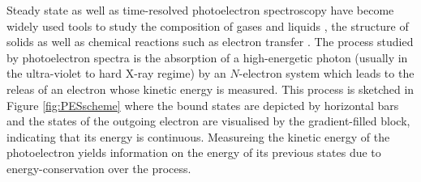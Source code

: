 Steady state as well as time-resolved photoelectron spec\-tros\-co\-py have become widely used tools to study the composition of gases and liquids \cite{winterWater,liquid1,XrayDynamics,hafied}, the structure of solids \cite{solid1} as well as chemical reactions such as electron transfer \cite{XrayDynamics}.
The process studied by photoelectron spectra is the absorption of a high-energetic photon (usually in the ultra-violet to hard X-ray regime) by an $N$-electron system which leads to the releas of an electron whose kinetic energy is measured.
This process is sketched in Figure \ref{fig:PESscheme} where the bound states are depicted by horizontal bars and the states of the outgoing electron are visualised by the gradient-filled block, indicating that its energy is continuous.
Measureing the kinetic energy of the photoelectron yields information on the energy of its previous states due to energy-conservation over the process.

